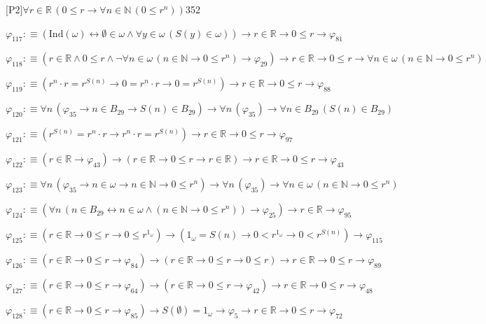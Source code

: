 \begin{fullproof}{[P2]}{$\forall r \in \mathbb{R}\,(0 \leq r \to \forall n \in \mathbb{N}\,(0 \leq {{r}^{n}}))$}{352}
\begin{abbrevlist}
\item $\varphi_{117} :\equiv (\mathrm{Ind}(\omega) \leftrightarrow \emptyset \in \omega \land \forall y \in \omega\,(S(y) \in \omega)) \to r \in \mathbb{R} \to 0 \leq r \to \varphi_{81}$
\item $\varphi_{118} :\equiv (r \in \mathbb{R} \land 0 \leq r \land \neg \forall n \in \omega\,(n \in \mathbb{N} \to 0 \leq {{r}^{n}}) \to \varphi_{29}) \to r \in \mathbb{R} \to 0 \leq r \to \forall n \in \omega\,(n \in \mathbb{N} \to 0 \leq {{r}^{n}})$
\item $\varphi_{119} :\equiv ({{r}^{n}} \cdot r = {{r}^{S(n)}} \to 0 = {{r}^{n}} \cdot r \to 0 = {{r}^{S(n)}}) \to r \in \mathbb{R} \to 0 \leq r \to \varphi_{88}$
\item $\varphi_{120} :\equiv \forall n\,(\varphi_{35} \to n \in B_{29} \to S(n) \in B_{29}) \to \forall n\,(\varphi_{35}) \to \forall n \in B_{29}\,(S(n) \in B_{29})$
\item $\varphi_{121} :\equiv ({{r}^{S(n)}} = {{r}^{n}} \cdot r \to {{r}^{n}} \cdot r = {{r}^{S(n)}}) \to r \in \mathbb{R} \to 0 \leq r \to \varphi_{97}$
\item $\varphi_{122} :\equiv (r \in \mathbb{R} \to \varphi_{43}) \to (r \in \mathbb{R} \to 0 \leq r \to r \in \mathbb{R}) \to r \in \mathbb{R} \to 0 \leq r \to \varphi_{43}$
\item $\varphi_{123} :\equiv \forall n\,(\varphi_{35} \to n \in \omega \to n \in \mathbb{N} \to 0 \leq {{r}^{n}}) \to \forall n\,(\varphi_{35}) \to \forall n \in \omega\,(n \in \mathbb{N} \to 0 \leq {{r}^{n}})$
\item $\varphi_{124} :\equiv (\forall n\,(n \in B_{29} \leftrightarrow n \in \omega \land (n \in \mathbb{N} \to 0 \leq {{r}^{n}})) \to \varphi_{25}) \to r \in \mathbb{R} \to \varphi_{95}$
\item $\varphi_{125} :\equiv (r \in \mathbb{R} \to 0 \leq r \to 0 \leq {{r}^{1_{\omega}}}) \to (1_{\omega} = S(n) \to 0 < {{r}^{1_{\omega}}} \to 0 < {{r}^{S(n)}}) \to \varphi_{115}$
\item $\varphi_{126} :\equiv (r \in \mathbb{R} \to 0 \leq r \to \varphi_{84}) \to (r \in \mathbb{R} \to 0 \leq r \to 0 \leq r) \to r \in \mathbb{R} \to 0 \leq r \to \varphi_{89}$
\item $\varphi_{127} :\equiv (r \in \mathbb{R} \to 0 \leq r \to \varphi_{64}) \to (r \in \mathbb{R} \to 0 \leq r \to \varphi_{42}) \to r \in \mathbb{R} \to 0 \leq r \to \varphi_{48}$
\item $\varphi_{128} :\equiv (r \in \mathbb{R} \to 0 \leq r \to \varphi_{85}) \to S(\emptyset) = 1_{\omega} \to \varphi_{5} \to r \in \mathbb{R} \to 0 \leq r \to \varphi_{72}$

\end{abbrevlist}
\end{fullproof}
